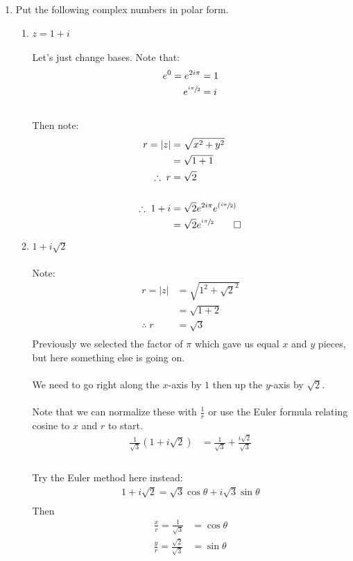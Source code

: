 \begin{enumerate}


	\item Put the following complex numbers in polar form.
	\begin{enumerate}
		
		
		\item $z = 1 + i$ \\
		\\ 
		Let's just change bases. Note that:
		\begin{align*}
			e^0 = e^{2i\pi} &= 1 \\
			e^{\sfrac{i\pi}{2}} &= i\\
		\end{align*} 
		\\
		Then note:
		\begin{align*}
			r = |z| &= \sqrt{x^2 + y^2} \\ 
			&= \sqrt{1 + 1} \\ 
			\therefore \; r &= \sqrt{2} \\
			\\
			\therefore \; 1 + i &= \sqrt{2} e^{2i\pi} e^{(\sfrac{i\pi}{2})} \\
			&= \sqrt{2}e^{\sfrac{i\pi}{2}} \qed
		\end{align*}
		
		
		\item $1 + i\sqrt{2}$ \\
		\\
		Note:
		\begin{align*}
			r = |z| &= \sqrt{1^2 + \sqrt{2}^2} \\
			&= \sqrt{1 + 2} \\
			\therefore \; r &= \sqrt{3}\\
		\end{align*}
		Previously we selected the factor of $\pi$ which gave us equal $x$ and $y$ pieces, but here something else is going on. \\
		\\
		We need to go right along the $x$-axis by $1$ then up the $y$-axis by $\sqrt{2}.$ \\
		\\
		Note that we can normalize these with $\frac{1}{r}$ or use the Euler formula relating cosine to $x$ and $r$ to start. \\
		
		\begin{align*}
			\frac{1}{\sqrt{3}}(1 + i\sqrt{2}) &= \frac{1}{\sqrt{3}} + \frac{i\sqrt{2}}{\sqrt{3}} \\
		\end{align*}
		\\
		Try the Euler method here instead:
		\begin{align*}
			1 + i\sqrt{2} = \sqrt{3}\cos\theta + i\sqrt{3}\sin\theta \\
		\end{align*}
		Then
		\begin{align*}
			\frac{x}{r} = \frac{1}{\sqrt{3}} &= \cos\theta \\
			\frac{y}{r} = \frac{\sqrt{2}}{\sqrt{3}} &= \sin\theta \\
		\end{align*}
		


\end{enumerate}
\end{enumerate}
